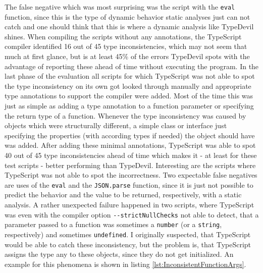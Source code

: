 \documentclass[runningheads,a4paper]{llncs}
\begin{document}
The false negative which was most surprising was the script with the \lstinline[columns=fixed]{eval} function, since this is the type of dynamic behavior static analyses just can not catch and one should think that this is where a dynamic analysis like TypeDevil shines.
When compiling the scripts without any annotations, the TypeScript compiler identified 16 out of 45 type inconsistencies, which may not seem that much at first glance, but is at least 45\% of the errors TypeDevil spots with the advantage of reporting these ahead of time without executing the program.
In the last phase of the evaluation all scripts for which TypeScript was not able to spot the type inconsistency on its own got looked through manually and appropriate type annotations to support the compiler were added.
Most of the time this was just as simple as adding a type annotation to a function parameter or specifying the return type of a function.
Whenever the type inconsistency was caused by objects which were structurally different, a simple class or interface just specifying the properties (with according types if needed) the object should have was added.
After adding these minimal annotations, TypeScript was able to spot 40 out of 45 type inconsistencies ahead of time which makes it - at least for these test scripts - better performing than TypeDevil.
Interesting are the scripts where TypeScript was not able to spot the incorrectness.
Two expectable false negatives are uses of the \lstinline[columns=fixed]{eval} and the \lstinline[columns=fixed]{JSON.parse} function, since it is just not possible to predict the behavior and the value to be returned, respectively, with a static analysis.
A rather unexpected failure happened in two scripts, where TypeScript was even with the compiler option \lstinline[columns=fixed]{--strictNullChecks} not able to detect, that a parameter passed to a function was sometimes a \lstinline[columns=fixed]{number} (or a \lstinline[columns=fixed]{string}, respectively) and sometimes \lstinline[columns=fixed]{undefined}.
I originally suspected, that TypeScript would be able to catch these inconsistency, but the problem is, that TypeScript assigns the type any to these objects, since they do not get initialized.
An example for this phenomena is shown in listing \ref{lst:InconsistentFunctionArgs}.
\end{document}
